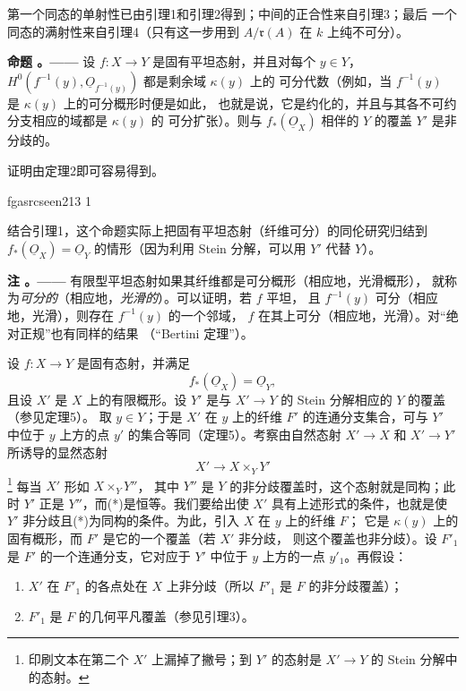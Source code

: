 \documentclass[12pt,twoside,openany]{book}
\numberwithin{equation}{section}
\newcommand{\fgaunitid}{unbound}
\newcommand{\src}[1]{%
  \phantomsection
  \hypertarget{src:\fgaunitid:#1}{}%
  \hypertarget{fga.\fgaunitid.p#1}{}%
  \ifcsname fgasrcseen#1\endcsname\else
    \expandafter\gdef\csname fgasrcseen#1\endcsname{1}%
    \hypertarget{src:#1}{}%
  \fi
  \marginpar{\raggedleft\footnotesize\sffamily #1}%
}
\newcommand{\Osh}{\underline{O}}
\newcommand{\fquote}[1]{“#1”}
\theoremstyle{plain}
\theoremstyle{definition}
\theoremstyle{remark}
\newcommand{\result}[2]{%
  \par\medskip\noindent\textbf{#1%
  \if\relax\detokenize{#2}\relax\else\space#2\fi。——}\enspace
}
\begin{document}
第一个同态的单射性已由引理1和引理2得到；中间的正合性来自引理3；最后
一个同态的满射性来自引理4（只有这一步用到
$A/\mathfrak r(A)$ 在 $k$ 上纯不可分）。

\result{命题}{4} 设 $f:X\longrightarrow Y$ 是固有平坦态射，并且对每个
$y\in Y$，$H^0(f^{-1}(y),\Osh_{f^{-1}(y)})$ 都是剩余域 $\kappa(y)$ 上的
可分代数（例如，当 $f^{-1}(y)$ 是 $\kappa(y)$ 上的可分概形时便是如此，
也就是说，它是约化的，并且与其各不可约分支相应的域都是 $\kappa(y)$ 的
可分扩张）。则与 $f_*(\Osh_X)$ 相伴的 $Y$ 的覆盖 $Y'$ 是非分歧的。

证明由定理2即可容易得到。

\src{213}
结合引理1，这个命题实际上把固有平坦态射（纤维可分）的同伦研究归结到
$f_*(\Osh_X)=\Osh_Y$ 的情形（因为利用 Stein 分解，可以用 $Y'$ 代替
$Y$）。

\result{注}{} 有限型平坦态射如果其纤维都是可分概形（相应地，光滑概形），
就称为\emph{可分的}（相应地，\emph{光滑的}）。可以证明，若 $f$ 平坦，
且 $f^{-1}(y)$ 可分（相应地，光滑），则存在 $f^{-1}(y)$ 的一个邻域，
$f$ 在其上可分（相应地，光滑）。对\fquote{绝对正规}也有同样的结果
（\fquote{Bertini 定理}）。

设 $f:X\longrightarrow Y$ 是固有态射，并满足
\begin{equation}
  \tag{i}
  f_*(\Osh_X)=\Osh_Y,
\end{equation}
且设 $X'$ 是 $X$ 上的有限概形。设 $Y'$ 是与
$X'\longrightarrow Y$ 的 Stein 分解相应的 $Y$ 的覆盖（参见定理5）。
取 $y\in Y$；于是 $X'$ 在 $y$ 上的纤维 $F'$ 的连通分支集合，可与 $Y'$
中位于 $y$ 上方的点 $y'$ 的集合等同（定理5）。考察由自然态射
$X'\longrightarrow X$ 和 $X'\longrightarrow Y'$ 所诱导的显然态射
\begin{equation}
  \tag{*}
  X'\longrightarrow X\times_Y Y'
\end{equation}
\footnote{印刷文本在第二个 $X'$ 上漏掉了撇号；到 $Y'$ 的态射是
$X'\to Y$ 的 Stein 分解中的态射。} 每当 $X'$ 形如 $X\times_Y Y''$，
其中 $Y''$ 是 $Y$ 的非分歧覆盖时，这个态射就是同构；此时 $Y'$ 正是
$Y''$，而(*)是恒等。我们要给出使 $X'$ 具有上述形式的条件，也就是使
$Y'$ 非分歧且(*)为同构的条件。为此，引入 $X$ 在 $y$ 上的纤维 $F$；
它是 $\kappa(y)$ 上的固有概形，而 $F'$ 是它的一个覆盖（若 $X'$ 非分歧，
则这个覆盖也非分歧）。设 $F'_1$ 是 $F'$ 的一个连通分支，它对应于 $Y'$
中位于 $y$ 上方的一点 $y'_1$。再假设：
\begin{enumerate}
  \item[\textit{(ii)}] $X'$ 在 $F'_1$ 的各点处在 $X$ 上非分歧（所以
    $F'_1$ 是 $F$ 的非分歧覆盖）；
  \item[\textit{(iii)}] $F'_1$ 是 $F$ 的几何平凡覆盖（参见引理3）。
\end{enumerate}
\end{document}
